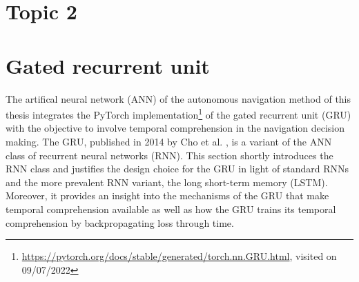 \section{Topic 2}

\section{Gated recurrent unit} \label{sec:gru}
The artifical neural network (ANN) of the autonomous navigation method of this thesis
integrates the PyTorch implementation\footnote{
    \url{https://pytorch.org/docs/stable/generated/torch.nn.GRU.html}, visited on 09/07/2022
}
of the gated recurrent unit (GRU)
with the objective to involve temporal comprehension in
the navigation decision making.
The GRU,
published in 2014 by Cho et al. \cite{Cho2014},
is a variant of the ANN class of recurrent neural networks (RNN).
This section shortly introduces the RNN class
and justifies the design choice for the GRU
in light of standard RNNs and 
the more prevalent RNN variant,
the long short-term memory (LSTM).
Moreover, it provides an insight into
the mechanisms of the GRU that make temporal comprehension available
as well as how the 
GRU trains its temporal comprehension by backpropagating 
loss through time.

